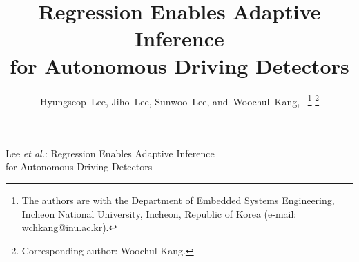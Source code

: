\documentclass[lettersize,journal]{IEEEtran}
\begin{document}
\title{Regression Enables Adaptive Inference\\for Autonomous Driving Detectors}

\author{Hyungseop~Lee,
        Jiho~Lee,
        Sunwoo~Lee,
        and~Woochul~Kang,~
    \thanks{
        The authors are with the Department of Embedded Systems Engineering,
        Incheon National University, Incheon, Republic of Korea
        (e-mail: wchkang@inu.ac.kr).
    }
    \thanks{
        Corresponding author: Woochul Kang.
    }
}

%
{Lee \MakeLowercase{\textit{et al.}}: Regression Enables Adaptive Inference\\for Autonomous Driving Detectors}

\maketitle










\end{document}
